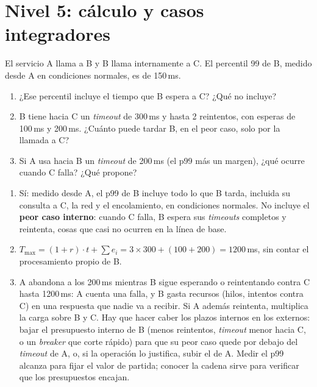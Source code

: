 \documentclass[variant=guia,cover=institutional,mode=screen]{ua-engineering-v6-article}
\begin{document}
\section{Nivel 5: cálculo y casos integradores}
\begin{uaexercise}
El servicio A llama a B y B llama internamente a C. El percentil 99 de B, medido desde A en condiciones normales, es de 150\,ms.
\begin{enumerate}
\item ¿Ese percentil incluye el tiempo que B espera a C? ¿Qué no incluye?
\item B tiene hacia C un \emph{timeout} de 300\,ms y hasta 2 reintentos, con esperas de 100\,ms y 200\,ms. ¿Cuánto puede tardar B, en el peor caso, solo por la llamada a C?
\item Si A usa hacia B un \emph{timeout} de 200\,ms (el p99 más un margen), ¿qué ocurre cuando C falla? ¿Qué propone?
\end{enumerate}
\end{uaexercise}
\begin{uaanswer}
\begin{enumerate}
\item Sí: medido desde A, el p99 de B incluye todo lo que B tarda, incluida su consulta a C, la red y el encolamiento, en condiciones normales. No incluye el \textbf{peor caso interno}: cuando C falla, B espera sus \emph{timeouts} completos y reintenta, cosas que casi no ocurren en la línea de base.
\item $T_{\max} = (1 + r)\cdot t + \sum e_i = 3 \times 300 + (100 + 200) = 1200$\,ms, sin contar el procesamiento propio de B.
\item A abandona a los 200\,ms mientras B sigue esperando o reintentando contra C hasta 1200\,ms: A cuenta una falla, y B gasta recursos (hilos, intentos contra C) en una respuesta que nadie va a recibir. Si A además reintenta, multiplica la carga sobre B y C. Hay que hacer caber los plazos internos en los externos: bajar el presupuesto interno de B (menos reintentos, \emph{timeout} menor hacia C, o un \emph{breaker} que corte rápido) para que su peor caso quede por debajo del \emph{timeout} de A, o, si la operación lo justifica, subir el de A. Medir el p99 alcanza para fijar el valor de partida; conocer la cadena sirve para verificar que los presupuestos encajan.
\end{enumerate}
\end{uaanswer}
\end{document}
